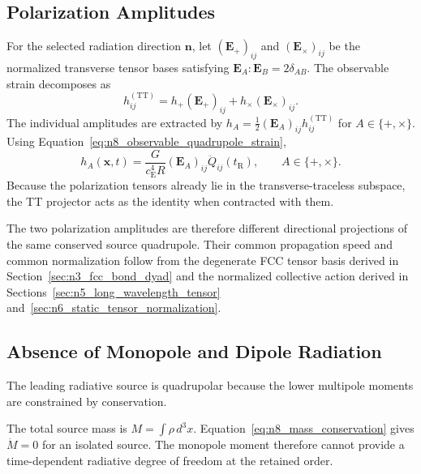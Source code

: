 \subsection{Polarization Amplitudes}
\label{subsec:n8_polarization_amplitudes}

For the selected radiation direction $\mathbf{n}$, let $(\mathbf{E}_{+})_{ij}$ and $(\mathbf{E}_{\times})_{ij}$ be the normalized transverse tensor bases satisfying $\mathbf{E}_{A}:\mathbf{E}_{B} = 2\delta_{AB}$. The observable strain decomposes as
\begin{equation}
    h_{ij}^{(\mathrm{TT})} = h_{+} (\mathbf{E}_{+})_{ij} + h_{\times} (\mathbf{E}_{\times})_{ij}.
    \label{eq:n8_polarization_decomposition}
\end{equation}
The individual amplitudes are extracted by $h_{A} = \frac{1}{2} (\mathbf{E}_{A})_{ij} h_{ij}^{(\mathrm{TT})}$ for $A\in\{+,\times\}$. Using Equation~\eqref{eq:n8_observable_quadrupole_strain},
\begin{equation}
    h_{A} (\mathbf{x},t) = \frac{G}{ c_{\mathrm{E}}^{4}R } (\mathbf{E}_{A})_{ij} \ddot{Q}_{ij} \left( t_{\mathrm{R}} \right), \qquad A\in\{+,\times\}.
    \label{eq:n8_polarization_quadrupole}
\end{equation}
Because the polarization tensors already lie in the transverse-traceless subspace, the TT projector acts as the identity when contracted with them.

The two polarization amplitudes are therefore different directional projections of the same conserved source quadrupole. Their common propagation speed and common normalization follow from the degenerate FCC tensor basis derived in Section~\ref{sec:n3_fcc_bond_dyad} and the normalized collective action derived in Sections~\ref{sec:n5_long_wavelength_tensor} and~\ref{sec:n6_static_tensor_normalization}.

\subsection{Absence of Monopole and Dipole Radiation}
\label{subsec:n8_no_monopole_dipole}

The leading radiative source is quadrupolar because the lower multipole moments are constrained by conservation.

The total source mass is $M = \int \rho\,d^{3}x$. Equation~\eqref{eq:n8_mass_conservation} gives $\dot{M} = 0$ for an isolated source. The monopole moment therefore cannot provide a time-dependent radiative degree of freedom at the retained order.


